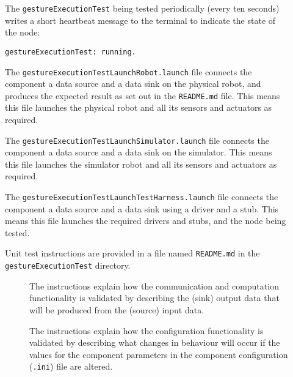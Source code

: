 \documentclass{CSSRforAfrica}
\newcommand{\checkboxChecked}{\fbox{\ding{51}}} %
\newcommand{\checkboxDashed}{\fbox{--}}         %
\begin{document}
\begin{description}
\item[\checkboxChecked]  The {\small \verb+gestureExecutionTest+} being tested periodically (every ten seconds) writes a short heartbeat message to
 the terminal to indicate the state of the node:
\begin{verbatim}
gestureExecutionTest: running.
\end{verbatim}

\item[\checkboxChecked] The {\small \verb+gestureExecutionTestLaunchRobot.launch+} file  connects the component a data source and a data sink on the physical robot, and produces the expected result as set out in the  {\small \verb+README.md+}  file.    This means this file launches the physical robot and all its sensors and actuators as required.

\item[\checkboxDashed] The {\small \verb+gestureExecutionTestLaunchSimulator.launch+} file  connects the component a data source and a data sink on the simulator.   This means this file launches the simulator robot and all its sensors and actuators as required.

\item[\checkboxChecked] The {\small \verb+gestureExecutionTestLaunchTestHarness.launch+} file  connects the component a data source and a data sink using a driver and a stub.   This means this file launches the required drivers and stubs, and the node being tested.

\item[\checkboxChecked] Unit test instructions are provided in a file named {\small \verb+README.md+} in the  {\small \verb+gestureExecutionTest+} directory. 


\begin{description}

\item[\checkboxChecked] The instructions explain how the communication and computation functionality is validated by describing the (sink) output data that will be produced from the (source) input data.  

\item[\checkboxChecked] The instructions explain how the configuration functionality is validated by describing what changes in behaviour will occur if the values for the component parameters in the component configuration ({\small \verb+.ini+}) file are altered.

\end{description}

\end{description} 
\end{document}

